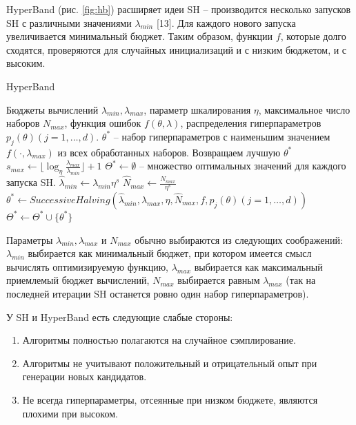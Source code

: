 \documentclass[a4paper,12pt]{article}
\begin{document}
HyperBand (рис. \ref{fig:hb}) расширяет идеи SH -- производится несколько запусков SH с различными значениями $\lambda_{min}$ [13]. Для каждого нового запуска увеличивается минимальный бюджет. Таким образом, функции $f$, которые долго сходятся, проверяются для случайных инициализаций и с низким бюджетом, и с высоким. 

\begin{algorithm}[H]
    \caption{HyperBand}\label{alg:hb}
  \begin{algorithmic}[1]
    \INPUT Бюджеты вычислений $\lambda_{min}, \lambda_{max}$, параметр шкалирования $\eta$, максимальное число наборов $N_{max}$, функция ошибок $f(\theta, \lambda)$, распределения гиперпараметров $p_{j}(\theta) (j = 1,\dots,d)$.
    \OUTPUT $\theta^*$ -- набор гиперпараметров с наименьшим значением $f(\cdot, \lambda_{max})$ из всех обработанных наборов. Возвращаем лучшую $\theta^*$
    \STATE $s_{max} \gets \lfloor \log_{\eta} \frac{\lambda_{max}}{\lambda_{min}} \rfloor + 1$
    \STATE $\Theta^* \gets \emptyset$ -- множество оптимальных значений для каждого запуска SH.
        \STATE $\hat{\lambda}_{min} \gets \lambda_{min}\eta^{s}$
        \STATE $\hat{N}_{max} \gets \frac{N_{max}}{\eta^{s}}$
        \STATE $\theta^* \gets SuccessiveHalving(\hat{\lambda}_{min}, \lambda_{max}, \eta, \hat{N}_{max}, f, p_{j}(\theta) (j = 1,\dots,d))$
        \STATE $\Theta^* \gets \Theta^* \cup \{\theta^*\}$
    \ENDFOR
  \end{algorithmic}

\end{algorithm}

Параметры $\lambda_{min},\lambda_{max}$ и $N_{max}$ обычно выбираются из следующих соображений: $\lambda_{min}$ выбирается как минимальный бюджет, при котором имеется смысл вычислять оптимизируемую функцию, $\lambda_{max}$ выбирается как максимальный приемлемый бюджет вычислений, $N_{max}$ выбирается равным $\lambda_{max}$ (так на последней итерации SH останется ровно один набор гиперпараметров).

У SH и HyperBand есть следующие слабые стороны:
\begin{enumerate}
    \item Алгоритмы полностью полагаются на случайное сэмплирование.
    \item Алгоритмы не учитывают положительный и отрицательный опыт при генерации новых кандидатов.
    \item Не всегда гиперпараметры, отсеянные при низком бюджете, являются плохими при высоком.
\end{enumerate}
\end{document}
